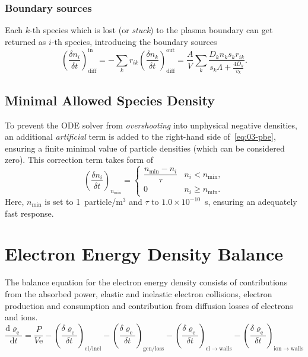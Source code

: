 \subsubsection{Boundary sources}
Each $k$-th species which is lost (or \emph{stuck}) to the plasma boundary can get returned as $i$-th species,
introducing the boundary sources
\begin{equation}
    \left( \frac{\delta n_{i}}{\delta t} \right)_{\mathrm{diff}}^{\mathrm{in}} =
    - \sum_{k} r_{ik} \left( \frac{\delta n_{k}}{\delta t} \right)_{\mathrm{diff}}^{\mathrm{out}} =
    \frac{A}{V} \sum_{k} \frac{D_k n_k s_k r_{ik}}{s_k \Lambda + \frac{4 D_k}{\overline{v}_{k}}}.
    \label{eq:03-diff-source}
\end{equation}

\subsection{Minimal Allowed Species Density}\label{subsec:03-minimal-allowed-species-density}
To prevent the ODE solver from \emph{overshooting} into unphysical negative densities, an additional \emph{artificial}
term is added to the right-hand side of~\eqref{eq:03-pbe}, ensuring a finite minimal value of particle densities
(which can be considered zero).
This correction term takes form of
\begin{equation}
    \left( \frac{\delta n_{i}}{\delta t} \right)_{n_{\mathrm{min}}} =
    \begin{cases}
        \dfrac{n_{\mathrm{min}} - n_{i}}{\tau} & n_{i} < n_{\mathrm{min}}, \\
        0 & n_{i} \ge n_{\mathrm{min}}.
    \end{cases}
\end{equation}
Here, $n_{\min}$ is set to 1~particle/m$^{3}$ and $\tau$ to $1.0 \times 10^{-10}$~s,
ensuring an adequately fast response.

\section{Electron Energy Density Balance}\label{sec:03-electron-energy-density-balance}
The balance equation for the electron energy density consists of contributions from the absorbed power,
elastic and inelastic electron collisions, electron production and consumption and contribution from diffusion losses
of electrons and ions.
\begin{equation}
    \frac{\mathrm{d} \varrho_{\mathrm{e}}}{\mathrm{d} t} =
    \frac{P}{V\mathrm{e}} -
    \left( \frac{\delta \varrho_{\mathrm{e}}}{\delta t} \right)_{\mathrm{el/inel}} -
    \left( \frac{\delta \varrho_{\mathrm{e}}}{\delta t} \right)_{\mathrm{gen/loss}} -
    \left( \frac{\delta \varrho_{\mathrm{e}}}{\delta t} \right)_{\mathrm{el \rightarrow walls}} -
    \left( \frac{\delta \varrho_{\mathrm{e}}}{\delta t} \right)_{\mathrm{ion \rightarrow walls}}
    \label{eq:03-eeb}
\end{equation}

